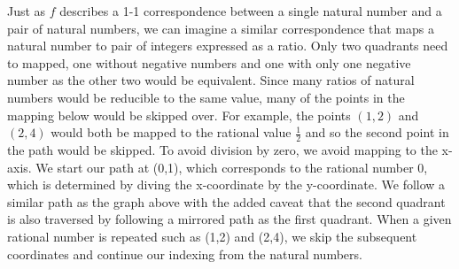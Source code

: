 \documentclass[12pt,letterpaper,reqno]{amsart}
\newcommand{\N}{\mathbb N}
\begin{document}
\begin{enumerate}
\begin{center}
\end{center}
\newpage
\begin{flushleft}
Just as $f$ describes a 1-1 correspondence between a single natural number and a pair of natural numbers, we can imagine a similar correspondence that maps a natural number to pair of integers expressed as a ratio. Only two quadrants need to mapped, one without negative numbers and one with only one negative number as the other two would be equivalent. Since many ratios of natural numbers would be reducible to the same value, many of the points in the mapping below would be skipped over. For example, the points $(1,2)$ and $(2,4)$ would both be mapped to the rational value $\frac{1}{2}$ and so the second point in the path would be skipped. To avoid division by zero, we avoid mapping to the x-axis. We start our path at (0,1), which corresponds to the rational number 0, which is determined by diving the x-coordinate by the y-coordinate. We follow a similar path as the graph above with the added caveat that the second quadrant is also traversed by following a mirrored path as the first quadrant. When a given rational number is repeated such as (1,2) and (2,4), we skip the subsequent coordinates and continue our indexing from the natural numbers.
\end{flushleft}


\end{enumerate}
\end{document}
